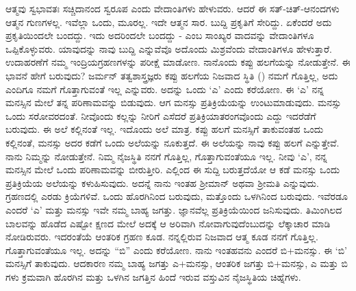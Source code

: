 ಆತ್ಮವು ಸ್ವಭಾವತಃ ಸಚ್ಚಿದಾನಂದ ಸ್ವರೂಪ ಎಂದು ವೇದಾಂತಿಗಳು ಹೇಳುವರು. ಆದರೆ ಈ ಸತ್-ಚಿತ್-ಆನಂದಗಳು ಆತ್ಮನ ಗುಣಗಳಲ್ಲ. ಇವೆಲ್ಲಾ ಒಂದು, ಮೂರಲ್ಲ. ಇದೇ ಆತ್ಮನ ಸಾರ. ಬುದ್ದಿ ಪ್ರಕೃತಿಗೆ ಸೇರಿದ್ದು. ಏಕೆಂದರೆ ಅದು ಪ್ರಕೃತಿಯಿಂದಲೇ ಬಂದದ್ದು. ಇದು ಅದರಿಂದಲೇ ಬಂದದ್ದು - ಎಂಬ ಸಾಂಖ್ಯರ ವಾದವನ್ನು ವೇದಾಂತಿಗಳೂ ಒಪ್ಪಿಕೊಳ್ಳುವರು. ಯಾವುದನ್ನು ನಾವು ಬುದ್ದಿ ಎನ್ನುವೆವೊ ಅದೊಂದು ಮಿಶ್ರವೆಂದು ವೇದಾಂತಿಗಳೂ ಹೇಳುತ್ತಾರೆ. ಉದಾಹರಣೆಗೆ ನಮ್ಮ ಇಂದ್ರಿಯಗ್ರಹಣಗಳನ್ನು ಪರೀಕ್ಷೆ ಮಾಡೋಣ. ನಾನೊಂದು ಕಪ್ಪು ಹಲಗೆಯನ್ನು ನೋಡುತ್ತೇನೆ. ಈ ಭಾವನೆ ಹೇಗೆ ಬರುವುದು? ಜರ್ಮನ್ ತತ್ವಶಾಸ್ತ್ರಜ್ಞರು ಕಪ್ಪು ಹಲಗೆಯ ನಿಜವಾದ ಸ್ಥಿತಿ () ನಮಗೆ ಗೊತ್ತಿಲ್ಲ, ಅದು ಎಂದಿಗೂ ನಮಗೆ ಗೊತ್ತಾಗುವಂತೆ ಇಲ್ಲ ಎನ್ನುವರು. ಅದನ್ನು ಒಂದು `ಎ' ಎಂದು ಕರೆಯೋಣ. ಈ `ಎ' ನನ್ನ ಮನಸ್ಸಿನ ಮೇಲೆ ತನ್ನ ಪರಿಣಾಮವನ್ನು ಬಿಡುವುದು. ಆಗ ಮನಸ್ಸು ಪ್ರತಿಕ್ರಿಯೆಯನ್ನು ಉಂಟುಮಾಡುವುದು. ಮನಸ್ಸು ಒಂದು ಸರೋವರದಂತೆ. ನೀವೊಂದು ಕಲ್ಲನ್ನು ನೀರಿಗೆ ಎಸೆದರೆ ಪ್ರತಿಕ್ರಿಯಾತರಂಗವೊಂದು ಎದ್ದು ಇದರೆಡೆಗೆ ಬರುವುದು. ಈ ಅಲೆ ಕಲ್ಲಿನಂತೆ ಇಲ್ಲ. ಇದೊಂದು ಅಲೆ ಮಾತ್ರ. ಕಪ್ಪು ಹಲಗೆ ಮನಸ್ಸಿಗೆ ತಾಕುವಂತಹ ಒಂದು ಕಲ್ಲಿನಂತೆ, ಮನಸ್ಸು ಅದರ ಕಡೆಗೆ ಒಂದು ಅಲೆಯನ್ನು ನೂಕುತ್ತದೆ. ಈ ಅಲೆಯನ್ನು ನಾವು ಕಪ್ಪು ಹಲಗೆ ಎನ್ನುತ್ತೇವೆ. ನಾನು ನಿಮ್ಮನ್ನು ನೋಡುತ್ತೇನೆ. ನಿಮ್ಮ ನೈಜಸ್ಥಿತಿ ನನಗೆ ಗೊತ್ತಿಲ್ಲ, ಗೊತ್ತಾಗುವಂತೆಯೂ ಇಲ್ಲ. ನೀವು `ಎ', ನನ್ನ ಮನಸ್ಸಿನ ಮೇಲೆ ಒಂದು ಪರಿಣಾಮವನ್ನು ಬೀರುತ್ತೀರಿ. ಎಲ್ಲಿಂದ ಈ ಸುದ್ದಿ ಬರುತ್ತದೆಯೋ ಆ ಕಡೆ ಮನಸ್ಸು ಒಂದು ಪ್ರತಿಕ್ರಿಯೆಯ ಅಲೆಯನ್ನು ಕಳುಹಿಸುವುದು. ಅದನ್ನೆ ನಾನು ಇಂತಹ ಶ‍್ರೀಮಾನ್ ಅಥವಾ ಶ‍್ರೀಮತಿ ಎನ್ನುವುದು. ಗ್ರಹಣದಲ್ಲಿ ಎರಡು ಕ್ರಿಯೆಗಳಿವೆ. ಒಂದು ಹೊರಗಿನಿಂದ ಬರುವುದು, ಮತ್ತೊಂದು ಒಳಗಿನಿಂದ ಬರುವುದು. ಇವೆರಡೂ ಎಂದರೆ `ಎ' ಮತ್ತು ಮನಸ್ಸು ಇವೇ ನಮ್ಮ ಬಾಹ್ಯ ಜಗತ್ತು. ಜ್ಞಾನವೆಲ್ಲ ಪ್ರತಿಕ್ರಿಯೆಯಿಂದ ಜನಿಸುವುದು. ತಿಮಿಂಗಿಲದ ಬಾಲವನ್ನು ಹೊಡೆದ ಎಷ್ಟೋ ಕ್ಷಣದ ಮೇಲೆ ಅದಕ್ಕೆ ಆ ಅರಿವಾಗಿ ನೋವಾಗುವುದೆಂಬುದನ್ನು ಲೆಕ್ಕಾಚಾರ ಮಾಡಿ ನೋಡಿರುವರು. ಇದರಂತೆಯೆ ಆಂತರಿಕ ಗ್ರಹಣ ಕೂಡ. ನನ್ನಲ್ಲಿರುವ ನಿಜವಾದ ಆತ್ಮ ಕೂಡ ನನಗೆ ಗೊತ್ತಿಲ್ಲ. ಗೊತ್ತಾಗುವಂತೆಯೂ ಇಲ್ಲ. ಅದನ್ನು “ಬಿ” ಎಂದು ಕರೆಯೋಣ. ನಾನು ಇಂತಹವನು ಎಂದರೆ ಬಿ+ಮನಸ್ಸು. ಈ `ಬಿ' ಮನಸ್ಸಿಗೆ ತಾಕುವುದು. ಆದಕಾರಣ ನಮ್ಮ ಬಾಹ್ಯ ಜಗತ್ತು ಎ+ಮನಸ್ಸು, ಆಂತರಿಕ ಜಗತ್ತು ಬಿ+ಮನಸ್ಸು, ಎ ಮತ್ತು ಬಿ ಗಳು ಕ್ರಮವಾಗಿ ಹೊರಗಿನ ಮತ್ತು ಒಳಗಿನ ಜಗತ್ತಿನ ಹಿಂದೆ ಇರುವ ವಸ್ತುವಿನ ನೈಜಸ್ಥಿತಿಯ ಚಿಹ್ನೆಗಳು.

